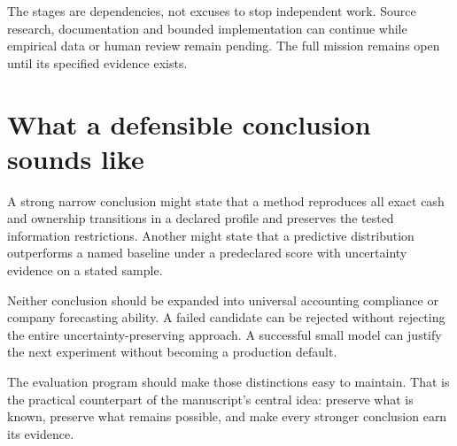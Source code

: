 The stages are dependencies, not excuses to stop independent work. Source research, documentation and bounded implementation can continue while empirical data or human review remain pending. The full mission remains open until its specified evidence exists.

\section{What a defensible conclusion sounds like}
A strong narrow conclusion might state that a method reproduces all exact cash and ownership transitions in a declared profile and preserves the tested information restrictions. Another might state that a predictive distribution outperforms a named baseline under a predeclared score with uncertainty evidence on a stated sample.

Neither conclusion should be expanded into universal accounting compliance or company forecasting ability. A failed candidate can be rejected without rejecting the entire uncertainty-preserving approach. A successful small model can justify the next experiment without becoming a production default.

The evaluation program should make those distinctions easy to maintain. That is the practical counterpart of the manuscript's central idea: preserve what is known, preserve what remains possible, and make every stronger conclusion earn its evidence.
